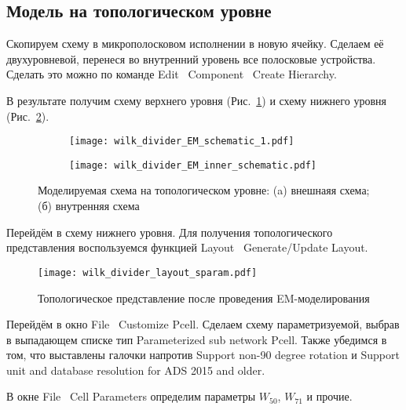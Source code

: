 \subsection{Модель на топологическом уровне}

Скопируем схему в микрополосковом исполнении в новую ячейку. Сделаем её двухуровневой, перенеся во внутренний уровень все полосковые устройства. Сделать это можно по команде Edit \textrightarrow\ Component \textrightarrow\ Create Hierarchy.

В результате получим схему верхнего уровня (Рис.~\ref{fig:wilk_divider_EM_schematic_1}) и схему нижнего уровня (Рис.~\ref{fig:wilk_divider_EM_inner_schematic}).

\begin{figure}[!ht]
    \centering
    \begin{subfigure}[b]{0.55\textwidth}
        \centering
        \texttt{[image: wilk\_divider\_EM\_schematic\_1.pdf]}
        \caption{}%
    \label{fig:wilk_divider_EM_schematic_1}
    \end{subfigure}
    \hfill
    \begin{subfigure}[b]{0.35\textwidth}
        \centering
        \texttt{[image: wilk\_divider\_EM\_inner\_schematic.pdf]}
        \caption{}%
    \label{fig:wilk_divider_EM_inner_schematic}
    \end{subfigure}
    \caption{%
        Моделируемая схема на топологическом уровне:
        (a) внешнаяя схема;
        (б) внутренняя схема
    }%
    \label{fig:wilk_divider_EM_schematics}
\end{figure}

Перейдём в схему нижнего уровня. Для получения топологического представления воспользуемся функцией Layout \textrightarrow\ Generate/Update Layout.

\begin{wrapfigure}{l}{0.2\textwidth}
    \centering
    \texttt{[image: wilk\_divider\_layout\_sparam.pdf]}
    \caption{Топологическое представление после проведения EM-моделирования}%
    \label{fig:wilk_divider_layout_sparam}
\end{wrapfigure}
Перейдём в окно File \textrightarrow\ Customize Pcell.
Сделаем схему параметризуемой, выбрав в выпадающем списке тип Parameterized sub network Pcell.
Также убедимся в том, что выставлены галочки напротив Support non-90 degree rotation и Support unit and database resolution for ADS 2015 and older.

В окне File \textrightarrow\ Cell Parameters определим параметры $W_{50}$, $W_{71}$ и прочие.

